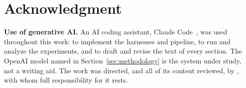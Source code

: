 \section*{Acknowledgment}
\textbf{Use of generative AI.} An AI coding assistant, Claude
Code~\cite{anthropic2026claudecode}, was used throughout this work: to
implement the harnesses and pipeline, to run and analyze the experiments, and
to draft and revise the text of every section. The OpenAI model named in
Section~\ref{sec:methodology} is the system under study, not a writing aid.
The work was directed, and all of its content reviewed, by
\responsibleauthor{}, with whom full responsibility for it rests.
